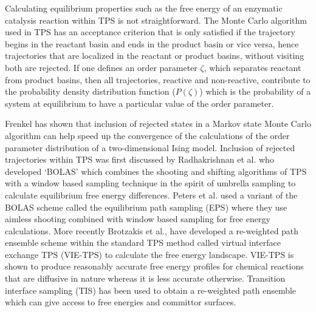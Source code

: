 \documentclass[journal=jpcbfk,manuscript=article,layout=traditional]{achemso}
\begin{document}
Calculating equilibrium properties such as the free energy of an enzymatic 
catalysis reaction within TPS is not straightforward. 
The Monte Carlo algorithm used in TPS has an acceptance criterion that 
is only satisfied if the trajectory begins in the reactant basin and ends in 
the product basin or vice versa, hence trajectories that are localized in the 
reactant or product basins, without visiting both are rejected. 
If one defines an order parameter $\zeta$, which separates reactant from 
product basins, then all trajectories, reactive and non-reactive, 
contribute to the probability density distribution function 
($P(\zeta)$) which is the probability of a system at equilibrium to have 
a particular value of the order parameter. \cite{Dellago09AdvCompSimAppp167} 

Frenkel has shown that inclusion of rejected states in a Markov state Monte 
Carlo algorithm can help speed up the convergence of the calculations of 
the order parameter distribution of a two-dimensional
Ising model. \cite{Frenkel04ProcNatAcadSci101p17571}
Inclusion of rejected trajectories within TPS was first discussed by Radhakrishnan 
et al. \cite{Radhakrishnan04JChemPhys121p2436} who developed `BOLAS' which combines 
the shooting and shifting algorithms of TPS with a window based sampling technique 
in the spirit of umbrella sampling to calculate equilibrium free energy 
differences. Peters et al. used a variant of the BOLAS scheme called the 
equilibrium path sampling (EPS) where they use aimless shooting 
combined with window based sampling for free energy calculations. 
\cite{Peters08JAmChemSoc130p17342,Beckham10epsbook} 
More recently Brotzakis et al., \cite{Brotzakis19JChemPhys151p174111}
have developed a re-weighted path ensemble scheme within the standard TPS method 
called virtual interface exchange TPS (VIE-TPS) to calculate the free energy 
landscape. VIE-TPS is shown to produce reasonably accurate free energy profiles for 
chemical reactions that are diffusive in nature whereas it is less accurate otherwise.
Transition interface sampling (TIS) has been used to obtain 
a re-weighted path ensemble which can give access to free energies 
and committor surfaces. \cite{Rogal10JChemPhys17p174109}
\end{document}
